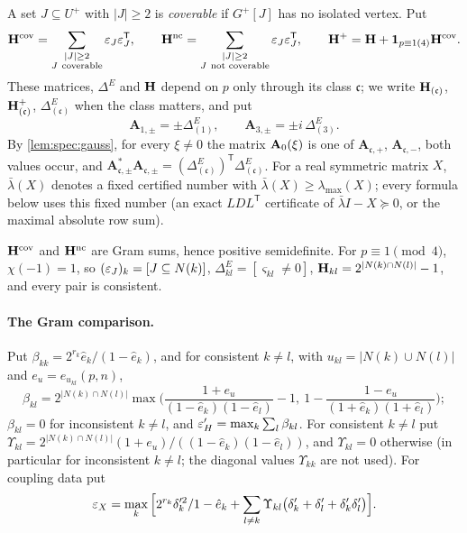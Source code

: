 \begin{definition}\label{def:coupling-model}
A set $J\subseteq U^+$ with $|J|\ge2$ is \emph{coverable} if $G^+[J]$ has no
isolated vertex. Put
\[
  \Hmat^{\rm cov}=\sum_{\substack{|J|\ge2\\ J\ \text{coverable}}}\eps_J\eps_J^{\mathsf T},\qquad
  \Hmat^{\rm nc}=\sum_{\substack{|J|\ge2\\ J\ \text{not coverable}}}\eps_J\eps_J^{\mathsf T},\qquad
  \Hmat^+=\Hmat+\one_{p\equiv1(4)}\Hmat^{\rm cov}.
\]
These matrices, $\Delta^E$ and $\mathbf H$ depend on $p$ only through its class
$\mathfrak c$; we write $\mathbf H_{(\mathfrak c)}$, $\mathbf H^+_{(\mathfrak c)}$,
$\Delta^E_{(\mathfrak c)}$ when the class matters, and put
\[
  \mathbf A_{1,\pm}=\pm\Delta^E_{(1)},\qquad \mathbf A_{3,\pm}=\pm i\,\Delta^E_{(3)}.
\]
By \cref{lem:spec:gauss}, for every $\xi\ne0$ the matrix $\mathbf A_{0}(\xi)$ is one of
$\mathbf A_{\mathfrak c,+}$, $\mathbf A_{\mathfrak c,-}$, both values occur, and
$\mathbf A_{\mathfrak c,\pm}^*\mathbf A_{\mathfrak c,\pm}=(\Delta^E_{(\mathfrak c)})^{\mathsf T}\Delta^E_{(\mathfrak c)}$.
For a real symmetric matrix $X$, $\bar\lambda(X)$ denotes a fixed certified number with $\bar\lambda(X)\ge\lambda_{\max}(X)$; every formula below uses this fixed number (an exact $LDL^{\mathsf T}$ certificate of
$\bar\lambda I-X\succeq0$, or the maximal absolute row sum).
\end{definition}

$\mathbf H^{\rm cov}$ and $\mathbf H^{\rm nc}$ are Gram sums, hence positive semidefinite.
For $p\equiv1\pmod4$, $\chi(-1)=1$, so $(\varepsilon_J)_k=[J\subseteq N(k)]$,
$\Delta^E_{kl}=[\varsigma_{kl}\ne0]$, $\mathbf H_{kl}=2^{|N(k)\cap N(l)|}-1$, and every pair is
consistent.

\paragraph{The Gram comparison.}
Put $\beta_{kk}=2^{r_k}\hat e_k/(1-\hat e_k)$, and for consistent $k\ne l$, with
$u_{kl}=|N(k)\cup N(l)|$ and $e_u=e_{u_{kl}}(p,n)$,
\begin{equation}\label{eq:spec:beta}
  \beta_{kl}=2^{|N(k)\cap N(l)|}\max\Big(\frac{1+e_u}{(1-\hat e_k)(1-\hat e_l)}-1,\
  1-\frac{1-e_u}{(1+\hat e_k)(1+\hat e_l)}\Big);
\end{equation}
$\beta_{kl}=0$ for inconsistent $k\ne l$, and $\varepsilon'_H=\max_k\sum_l\beta_{kl}$. For
consistent $k\ne l$ put
$\Upsilon_{kl}=2^{|N(k)\cap N(l)|}(1+e_u)/((1-\hat e_k)(1-\hat e_l))$, and
$\Upsilon_{kl}=0$ otherwise (in particular for inconsistent $k\ne l$; the diagonal values $\Upsilon_{kk}$ are not used). For coupling data put
\[
  \varepsilon_X=\max_k\Big[2^{r_k}\delta'^2_k/1-\hat e_k+\sum_{l\ne k}\Upsilon_{kl}
  \big(\delta'_k+\delta'_l+\delta'_k\delta'_l\big)\Big].
\]

